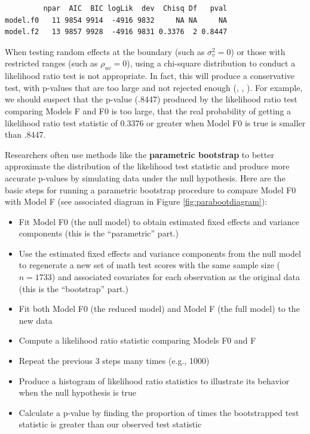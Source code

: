 \documentclass[
]{krantz}
\providecommand{\tightlist}{%
  \setlength{\itemsep}{0pt}\setlength{\parskip}{0pt}}
\begin{document}
\begin{verbatim}
         npar  AIC  BIC logLik  dev  Chisq Df   pval
model.f0   11 9854 9914  -4916 9832     NA NA     NA
model.f2   13 9857 9928  -4916 9831 0.3376  2 0.8447
\end{verbatim}

When testing random effects at the boundary (such as \(\sigma_{v}^{2} = 0\)) or those with restricted ranges (such as \(\rho_{uv} = 0\)), using a chi-square distribution to conduct a likelihood ratio test is not appropriate. In fact, this will produce a conservative test, with p-values that are too large and not rejected enough (\citet{Bryk2002}, \citet{Singer2003}, \citet{Faraway2005}). For example, we should suspect that the p-value (.8447) produced by the likelihood ratio test comparing Models F and F0 is too large, that the real probability of getting a likelihood ratio test statistic of 0.3376 or greater when Model F0 is true is smaller than .8447.

Researchers often use methods like the \textbf{parametric bootstrap}  to better approximate the distribution of the likelihood test statistic and produce more accurate p-values by simulating data under the null hypothesis. Here are the basic steps for running a parametric bootstrap procedure to compare Model F0 with Model F (see associated diagram in Figure \ref{fig:parabootdiagram}):

\begin{itemize}
\tightlist
\item
  Fit Model F0 (the null model) to obtain estimated fixed effects and variance components (this is the ``parametric'' part.)
\item
  Use the estimated fixed effects and variance components from the null model to regenerate a new set of math test scores with the same sample size (\(n=1733\)) and associated covariates for each observation as the original data (this is the ``bootstrap'' part.)
\item
  Fit both Model F0 (the reduced model) and Model F (the full model) to the new data
\item
  Compute a likelihood ratio statistic comparing Models F0 and F
\item
  Repeat the previous 3 steps many times (e.g., 1000)
\item
  Produce a histogram of likelihood ratio statistics to illustrate its behavior when the null hypothesis is true
\item
  Calculate a p-value by finding the proportion of times the bootstrapped test statistic is greater than our observed test statistic
\end{itemize}
\end{document}
